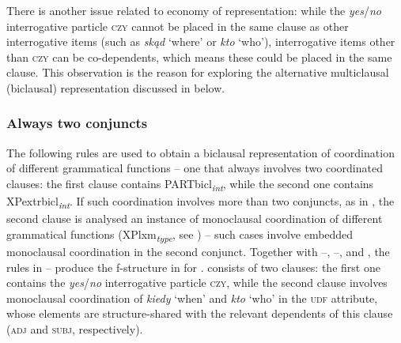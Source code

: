 \documentclass[output=paper]{../langscibook}
\begin{document}
There is another issue related to economy of representation: while the \emph{yes}/\emph{no}
interrogative particle \textsc{czy} cannot be placed in the same
clause as other interrogative items (such as \emph{skąd} `where' or
\emph{kto} `who'), interrogative items other than \textsc{czy} can be
co-dependents, which means these could be placed in the same
clause.
This observation is the reason for exploring the alternative
multiclausal (biclausal) representation
discussed in  below.

\subsubsection{Always two conjuncts}
\label{sec:Coordination:lexsem:multi:bicl}

The following rules are used to obtain a biclausal representation of
coordination of different grammatical functions – one that always
involves two coordinated clauses: the first clause contains
PARTbicl\textsubscript{\textit{int}}, while the second one contains XPextrbicl\textsubscript{\textit{int}}. If
such coordination involves more than two conjuncts, as in
, the second clause is analysed an instance of
monoclausal coordination of different grammatical functions
(XPlxm\textsubscript{\textit{type}}, see ) – such
cases involve embedded monoclausal coordination in the second conjunct.
\ea\label{ex:Patejuk2015:5.242}
\z
\ea\label{ex:Patejuk2015:5.243}
\z
Together with –,
–, 
and , the rules in
– produce the f-structure
in  for
. 
consists of two clauses: the first one contains the
\emph{yes}/\emph{no} interrogative particle \textsc{czy}, while the
second clause involves monoclausal coordination of \emph{kiedy} `when' and
\emph{kto} `who' in the \textsc{udf} attribute, whose elements are
structure-shared with the relevant dependents of this clause
(\textsc{adj} and \textsc{subj}, respectively).
\end{document}
